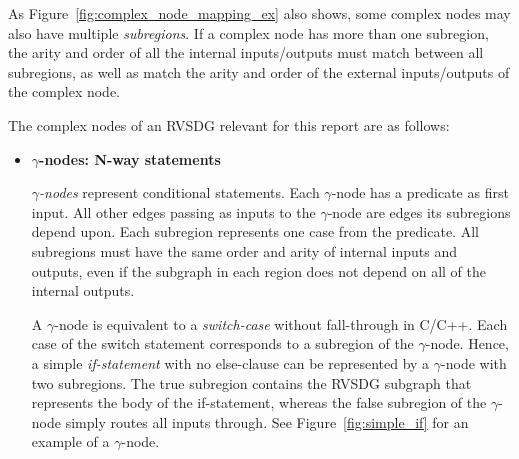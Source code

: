 As Figure~\ref{fig:complex_node_mapping_ex} also shows, some complex nodes may
also have multiple \textit{subregions}. If a complex node has more than one
subregion, the arity and order of all the internal inputs/outputs must match
between all subregions, as well as match the arity and order of the external
inputs/outputs of the complex node.

The complex nodes of an RVSDG relevant for this report are as follows:

\begin{itemize}

\item \textbf{$\gamma$-nodes: N-way statements}

\textit{$\gamma$-nodes} represent conditional statements. Each $\gamma$-node has
a predicate as first input. All other edges passing as inputs to the
$\gamma$-node are edges its subregions depend upon. Each subregion represents
one case from the predicate. All subregions must have the same order and arity
of internal inputs and outputs, even if the subgraph in each region does not
depend on all of the internal outputs.

A $\gamma$-node is equivalent to a \textit{switch-case} without fall-through in
C/C++. Each case of the switch statement corresponds to a subregion of the
$\gamma$-node. Hence, a simple \textit{if-statement} with no else-clause can be
represented by a $\gamma$-node with two subregions. The true subregion contains
the RVSDG subgraph that represents the body of the if-statement, whereas the
false subregion of the $\gamma$-node simply routes all inputs through. See
Figure~\ref{fig:simple_if} for an example of a $\gamma$-node.


\end{itemize}
